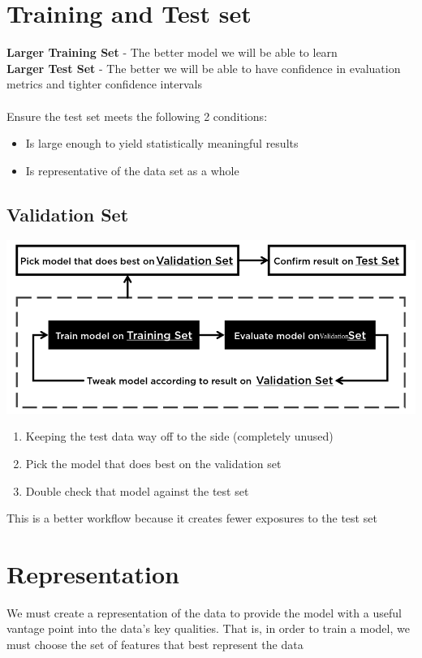\documentclass{article}[18pt]
\begin{document}
\section{Training and Test set}
\textbf{Larger Training Set} - The better model we will be able to learn\\
\textbf{Larger Test Set} - The better we will be able to have confidence in evaluation metrics and tighter confidence intervals\\
\\
Ensure the test set meets the following 2 conditions:
\begin{itemize}
	\item Is large enough to yield statistically meaningful results
	\item Is representative of the data set as a whole
\end{itemize}
\subsection{Validation Set}
\begin{center}
	\includegraphics[scale=0.7]{Validation}
\end{center}
\begin{enumerate}
	\item Keeping the test data way off to the side (completely unused)
	\item Pick the model that does best on the validation set
	\item Double check that model against the test set 
\end{enumerate}
This is a better workflow because it creates fewer exposures to the test set
\section{Representation}
We must create a representation of the data to provide the model with a useful vantage point into the data's key qualities. That is, in order to train a model, we must choose the set of features that best represent the data
\end{document}
